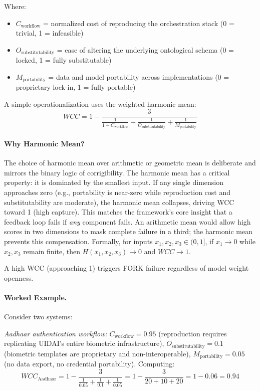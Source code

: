 \documentclass{article}
\begin{document}
Where:
\begin{itemize}[noitemsep]
    \item $C_{\text{workflow}}$ = normalized cost of reproducing the orchestration stack (0 = trivial, 1 = infeasible)
    \item $O_{\text{substitutability}}$ = ease of altering the underlying ontological schema (0 = locked, 1 = fully substitutable)
    \item $M_{\text{portability}}$ = data and model portability across implementations (0 = proprietary lock-in, 1 = fully portable)
\end{itemize}

A simple operationalization uses the weighted harmonic mean:
\begin{equation}
WCC = 1 - \frac{3}{\frac{1}{1-C_{\text{workflow}}} + \frac{1}{O_{\text{substitutability}}} + \frac{1}{M_{\text{portability}}}}
\end{equation}

\paragraph{Why Harmonic Mean?} The choice of harmonic mean over arithmetic or geometric mean is deliberate and mirrors the binary logic of corrigibility. The harmonic mean has a critical property: it is dominated by the smallest input. If any single dimension approaches zero (e.g., portability is near-zero while reproduction cost and substitutability are moderate), the harmonic mean collapses, driving WCC toward 1 (high capture). This matches the framework's core insight that a feedback loop fails if \textit{any} component fails. An arithmetic mean would allow high scores in two dimensions to mask complete failure in a third; the harmonic mean prevents this compensation. Formally, for inputs $x_1, x_2, x_3 \in (0,1]$, if $x_1 \to 0$ while $x_2, x_3$ remain finite, then $H(x_1, x_2, x_3) \to 0$ and $WCC \to 1$.

A high WCC (approaching 1) triggers FORK failure regardless of model weight openness.

\paragraph{Worked Example.} Consider two systems:

\textit{Aadhaar authentication workflow:} $C_{\text{workflow}} = 0.95$ (reproduction requires replicating UIDAI's entire biometric infrastructure), $O_{\text{substitutability}} = 0.1$ (biometric templates are proprietary and non-interoperable), $M_{\text{portability}} = 0.05$ (no data export, no credential portability). Computing:
\[
WCC_{\text{Aadhaar}} = 1 - \frac{3}{\frac{1}{0.05} + \frac{1}{0.1} + \frac{1}{0.05}} = 1 - \frac{3}{20 + 10 + 20} = 1 - 0.06 = 0.94
\]
\end{document}
